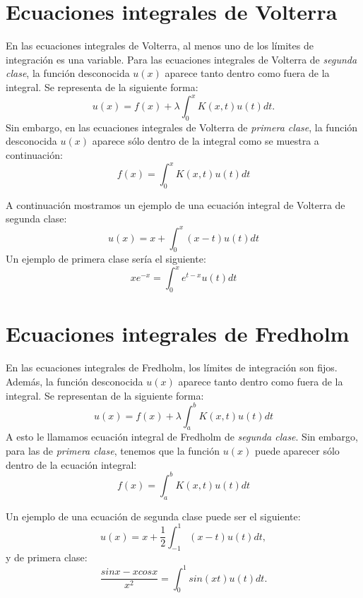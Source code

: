 \section{Ecuaciones integrales de Volterra}
\begin{definicion}
	En las ecuaciones integrales de Volterra, al menos uno de los límites de integración es una variable. Para las ecuaciones integrales de Volterra de \textit{segunda clase}, la función desconocida $u(x)$ aparece tanto dentro como fuera de la integral. Se representa de la siguiente forma:
	\begin{equation}\label{eq:volterra}
		u(x) = f(x) + \lambda \int_0^x K(x,t)u(t)dt.
	\end{equation}
	Sin embargo, en las ecuaciones integrales de Volterra de \textit{primera clase}, la función desconocida $u(x)$ aparece sólo dentro de la integral como se muestra a continuación:
	\begin{equation}\label{}
		f(x) = \int_0^x K(x,t)u(t)dt
	\end{equation}
\end{definicion}
\begin{ejemplo}
	A continuación mostramos un ejemplo de una ecuación integral de Volterra de segunda clase:
	\begin{equation}\label{}
		u(x) = x + \int_0^x (x-t)u(t)dt
	\end{equation}
	Un ejemplo de primera clase sería el siguiente:
	\begin{equation}\label{}
	xe^{-x} = \int_0^x e^{t-x}u(t)dt
	\end{equation}	
\end{ejemplo}

\section{Ecuaciones integrales de Fredholm}
\begin{definicion}
	En las ecuaciones integrales de Fredholm, los límites de integración son fijos. Además, la función desconocida $u(x)$ aparece tanto dentro como fuera de la integral. Se representan de la siguiente forma:
	\begin{equation}\label{}
		u(x) = f(x) + \lambda \int_a^b K(x,t)u(t)dt
	\end{equation}
	A esto le llamamos ecuación integral de Fredholm de \textit{segunda clase}. Sin embargo, para las de \textit{primera clase}, tenemos que la función $u(x)$ puede aparecer sólo dentro de la ecuación integral:
	\begin{equation}\label{}
		f(x) = \int_a^b K(x,t)u(t)dt
	\end{equation}
\end{definicion}
\begin{ejemplo}
	Un ejemplo de una ecuación de segunda clase puede ser el siguiente:
	\begin{equation}\label{}
		u(x) = x + \dfrac{1}{2}\int_{-1}^1 (x-t)u(t)dt,
	\end{equation}
	y de primera clase:
	\begin{equation}\label{}
		\dfrac{sinx - xcosx}{x^2} = \int_0^1 sin(xt)u(t)dt.
	\end{equation}
\end{ejemplo}

